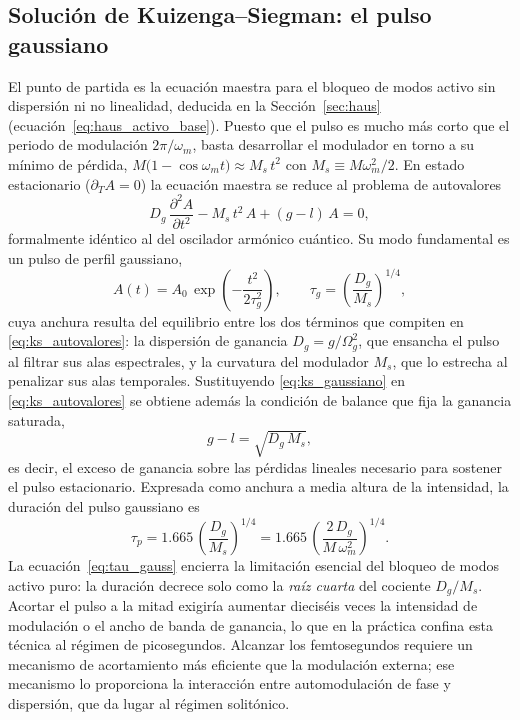 \subsection{Solución de Kuizenga--Siegman: el pulso gaussiano}
\label{sec:kuizenga_siegman}

El punto de partida es la ecuación maestra para el bloqueo de modos activo sin
dispersión ni no linealidad, deducida en la Sección~\ref{sec:haus}
(ecuación~\eqref{eq:haus_activo_base}). Puesto que el pulso es mucho más corto que
el periodo de modulación $2\pi/\omega_m$, basta desarrollar el modulador en torno
a su mínimo de pérdida, $M\bigl(1-\cos\omega_m t\bigr)\approx M_s\,t^2$ con
$M_s\equiv M\omega_m^2/2$. En estado estacionario ($\partial_T A = 0$) la ecuación
maestra se reduce al problema de autovalores
%
\begin{equation}
    D_g\,\frac{\partial^2 A}{\partial t^2}
    - M_s\,t^2\,A + (g-l)\,A = 0,
    \label{eq:ks_autovalores}
\end{equation}
%
formalmente idéntico al del oscilador armónico cuántico. Su modo fundamental es un
pulso de perfil gaussiano,
%
\begin{equation}
    A(t) = A_0\,\exp\!\left(-\frac{t^2}{2\tau_g^{2}}\right),
    \qquad
    \tau_g = \left(\frac{D_g}{M_s}\right)^{1/4},
    \label{eq:ks_gaussiano}
\end{equation}
%
cuya anchura resulta del equilibrio entre los dos términos que compiten en
\eqref{eq:ks_autovalores}: la dispersión de ganancia $D_g=g/\Omega_g^2$, que
ensancha el pulso al filtrar sus alas espectrales, y la curvatura del modulador
$M_s$, que lo estrecha al penalizar sus alas temporales. Sustituyendo
\eqref{eq:ks_gaussiano} en \eqref{eq:ks_autovalores} se obtiene además la
condición de balance que fija la ganancia saturada,
%
\begin{equation}
    g - l = \sqrt{D_g\,M_s},
    \label{eq:ks_balance}
\end{equation}
%
es decir, el exceso de ganancia sobre las pérdidas lineales necesario para
sostener el pulso estacionario. Expresada como anchura a media altura de la
intensidad, la duración del pulso gaussiano es
%
\begin{equation}
    \tau_p = 1.665\,\left(\frac{D_g}{M_s}\right)^{1/4}
           = 1.665\,\left(\frac{2\,D_g}{M\,\omega_m^{2}}\right)^{1/4}.
    \label{eq:tau_gauss}
\end{equation}
%
La ecuación~\eqref{eq:tau_gauss} encierra la limitación esencial del bloqueo de
modos activo puro: la duración decrece solo como la \emph{raíz cuarta} del
cociente $D_g/M_s$. Acortar el pulso a la mitad exigiría aumentar dieciséis veces
la intensidad de modulación o el ancho de banda de ganancia, lo que en la práctica
confina esta técnica al régimen de picosegundos. Alcanzar los femtosegundos
requiere un mecanismo de acortamiento más eficiente que la modulación externa; ese
mecanismo lo proporciona la interacción entre automodulación de fase y dispersión,
que da lugar al régimen solitónico.

